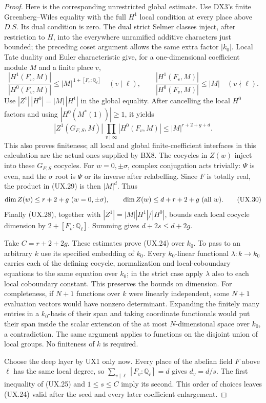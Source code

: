 \begin{proof}
Here is the corresponding unrestricted global estimate.
Use DX3's finite Greenberg--Wiles equality with the full
$H^1$ local condition at every place above $D.S$.
Its dual condition is zero.  The dual strict Selmer
classes inject, after restriction to $H$, into the
everywhere unramified additive characters just bounded;
the preceding coset argument allows the same extra
factor $|k_0|$.  Local Tate duality and Euler
characteristic give, for a one-dimensional coefficient
module $M$ and a finite place $v$,
\[
 \frac{|H^1(F_v,M)|}{|H^0(F_v,M)|}
 \le |M|^{\,1+[F_v:\mathbb Q_\ell]}
       \quad(v\mid\ell),\qquad
 \frac{|H^1(F_v,M)|}{|H^0(F_v,M)|}\le |M|
       \quad(v\nmid\ell).
 \tag{UX.28}
\]
Use $|Z^1|\,|H^0|=|M|\,|H^1|$ in the global equality.
After cancelling the local $H^0$ factors and using
$|H^0(M^*(1))|\ge1$, it yields
\[
 |Z^1(G_{F,S},M)|\,
       \prod_{v\mid\infty}|H^0(F_v,M)|
       \le |M|^{r+2+g+d}.
 \tag{UX.29}
\]
This also proves finiteness; all local and global
finite-coefficient interfaces in this calculation are
the actual ones supplied by BX8.  The cocycles in $Z(w)$
inject into these $G_{F,S}$ cocycles.  For
$w=0,\pm\sigma$, complex conjugation acts trivially:
$\Psi$ is even, and the $\sigma$ root is $\Psi$ or its
inverse after relabelling.  Since $F$ is totally real,
the product in (UX.29) is then $|M|^d$.  Thus
\[
 \dim Z(w)\le r+2+g\ (w=0,\pm\sigma),\qquad
 \dim Z(w)\le d+r+2+g\ (\hbox{all }w).
 \tag{UX.30}
\]
Finally (UX.28), together with
$|Z^1|=|M||H^1|/|H^0|$, bounds each local cocycle
dimension by $2+[F_v:\mathbb Q_\ell]$.  Summing gives
$d+2s\le d+2g$.

Take $C=r+2+2g$.  These estimates prove (UX.24) over
$k_0$.  To pass to an arbitrary $k$ use its specified
embedding of $k_0$.  Every $k_0$-linear functional
$\lambda:k\to k_0$ carries each of the defining
cocycle, normalization and local-coboundary equations
to the same equation over $k_0$; in the strict case
apply $\lambda$ also to each local coboundary constant.
This preserves the bounds on dimension.  For
completeness, if $N+1$ functions over $k$ were linearly
independent, some $N+1$ evaluation vectors would have
nonzero determinant.  Expanding the finitely many
entries in a $k_0$-basis of their span and taking
coordinate functionals would put their span inside
the scalar extension of the at most $N$-dimensional
space over $k_0$, a contradiction.  The same argument
applies to functions on the disjoint union of local
groups.  No finiteness of $k$ is required.

Choose the deep layer by UX1 only now.  Every place of
the abelian field $F$ above $\ell$ has the same local
degree, so $\sum_{v\mid\ell}[F_v:\mathbb Q_\ell]=d$
gives $d_v=d/s$.  The first inequality of (UX.25)
and $1\le s\le C$ imply its second.  This order of
choices leaves (UX.24) valid after the seed and every
later coefficient enlargement.
\end{proof}

